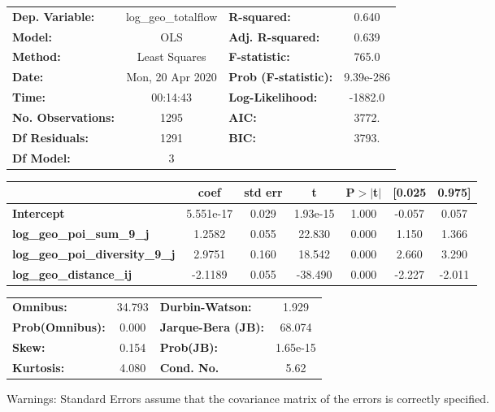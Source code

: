 \begin{center}
\begin{tabular}{lclc}
\toprule
\textbf{Dep. Variable:}                 & log\_geo\_totalflow & \textbf{  R-squared:         } &     0.640   \\
\textbf{Model:}                         &         OLS         & \textbf{  Adj. R-squared:    } &     0.639   \\
\textbf{Method:}                        &    Least Squares    & \textbf{  F-statistic:       } &     765.0   \\
\textbf{Date:}                          &   Mon, 20 Apr 2020  & \textbf{  Prob (F-statistic):} & 9.39e-286   \\
\textbf{Time:}                          &       00:14:43      & \textbf{  Log-Likelihood:    } &   -1882.0   \\
\textbf{No. Observations:}              &          1295       & \textbf{  AIC:               } &     3772.   \\
\textbf{Df Residuals:}                  &          1291       & \textbf{  BIC:               } &     3793.   \\
\textbf{Df Model:}                      &             3       & \textbf{                     } &             \\
\bottomrule
\end{tabular}
\begin{tabular}{lcccccc}
                                        & \textbf{coef} & \textbf{std err} & \textbf{t} & \textbf{P$> |$t$|$} & \textbf{[0.025} & \textbf{0.975]}  \\
\midrule
\textbf{Intercept}                      &    5.551e-17  &        0.029     &  1.93e-15  &         1.000        &       -0.057    &        0.057     \\
\textbf{log\_geo\_poi\_sum\_9\_j}       &       1.2582  &        0.055     &    22.830  &         0.000        &        1.150    &        1.366     \\
\textbf{log\_geo\_poi\_diversity\_9\_j} &       2.9751  &        0.160     &    18.542  &         0.000        &        2.660    &        3.290     \\
\textbf{log\_geo\_distance\_ij}         &      -2.1189  &        0.055     &   -38.490  &         0.000        &       -2.227    &       -2.011     \\
\bottomrule
\end{tabular}
\begin{tabular}{lclc}
\textbf{Omnibus:}       & 34.793 & \textbf{  Durbin-Watson:     } &    1.929  \\
\textbf{Prob(Omnibus):} &  0.000 & \textbf{  Jarque-Bera (JB):  } &   68.074  \\
\textbf{Skew:}          &  0.154 & \textbf{  Prob(JB):          } & 1.65e-15  \\
\textbf{Kurtosis:}      &  4.080 & \textbf{  Cond. No.          } &     5.62  \\
\bottomrule
\end{tabular}
\end{center}

Warnings: \newline
 [1] Standard Errors assume that the covariance matrix of the errors is correctly specified.